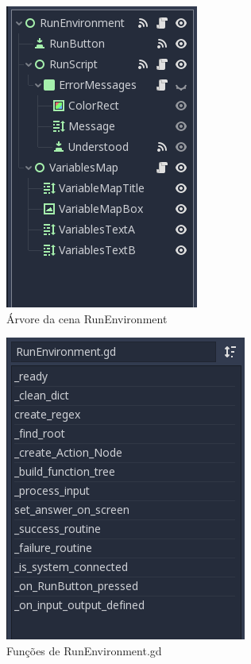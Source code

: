 \begin{minipage}[c]{0.5\textwidth}
    \begin{figure}[H]
        \includegraphics[scale=0.8]{../figuras/cena_RunEnvironment.png}
        \caption{Árvore da cena RunEnvironment}
    \end{figure}
\end{minipage}%
\begin{minipage}[c]{0.5\textwidth}
    \begin{figure}[H]
        \includegraphics[scale=0.8]{../figuras/funcoes_RunEnvironment.png}
        \caption{Funções de RunEnvironment.gd}
    \end{figure}
\end{minipage}

